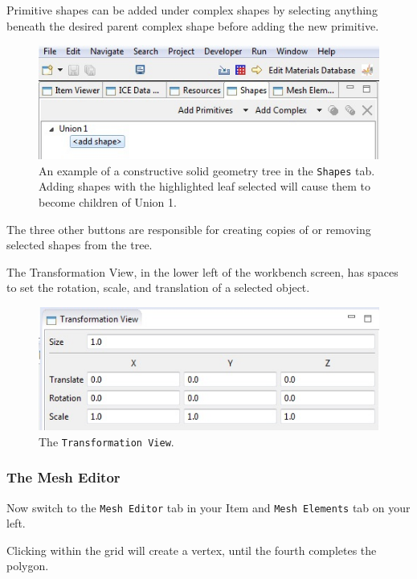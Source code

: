 Primitive shapes can be added under complex shapes by selecting anything beneath
the desired parent complex shape before adding the new primitive.

\begin{figure}[!h]
\includegraphics[width=12cm]{images/ComplexShapeTree}
\centering
\caption{An example of a constructive solid geometry tree in the
\texttt{Shapes} tab. Adding shapes with the highlighted leaf selected will
cause them to become children of Union 1.}
\label{fig:complexshapetree}
\end{figure}

The three other buttons are responsible for creating copies of or removing
selected shapes from the tree. 

The Transformation View, in the lower left of the workbench screen, has spaces
to set the rotation, scale, and translation of a selected object.

\begin{figure}[!h]
\includegraphics[width=12cm]{images/TransformationView}
\centering
\caption{The \texttt{Transformation View}.}
\label{fig:transformationview}
\end{figure}

\subsubsection{The Mesh Editor}

Now switch to the \texttt{Mesh Editor} tab in your Item and \texttt{Mesh
Elements} tab on your left.

Clicking within the grid will create a vertex, until the fourth completes the
polygon.

